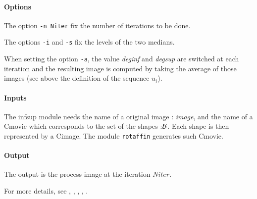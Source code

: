 \paragraph{Options} \mbox{}

The option \verb+-n Niter+ fix the number of iterations to be done. 

The options \verb+-i+ and \verb+-s+ fix the levels of the two medians.

When setting the option \verb+-a+, the value  {\it deginf} and {\it degsup} are switched 
at each iteration and the resulting image is computed by taking the average of those
images (see above the definition of the sequence $u_i$).

\paragraph{Inputs} \mbox{}

The infsup module needs the name of a original image : {\it image}, and the
name of a Cmovie which corresponds to the set of the shapes :${\cal B}$. Each shape is then represented by a Cimage.
The module \verb+rotaffin+ generates such Cmovie.

\paragraph{Output} \mbox{}

The output is the process image at the iteration $Niter$.

\vskip 1cm

For more details, see \cite{guichard.morel:pdeimage}, 
\cite{catte.dibos:morphomcm}, \cite{catte.dibos.koepfler:mcmscheme},
\cite{catte:conv}, \cite{guichard:phd}.












